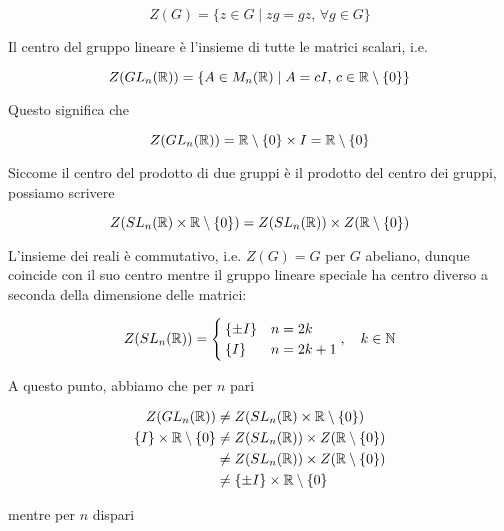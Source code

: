 \begin{equation}
	Z(G) = \{ z \in G \mid zg = gz, \, \forall g \in G \}
\end{equation}

Il centro del gruppo lineare è l'insieme di tutte le matrici scalari, i.e.

\begin{equation}
	Z(GL_{n}(\mathbb{R})) = \{ A \in M_{n}(\mathbb{R}) \mid A = c I, \, c \in \mathbb{R} \setminus \{0\} \}
\end{equation}

Questo significa che

\begin{equation}
	Z(GL_{n}(\mathbb{R})) = \mathbb{R} \setminus \{0\} \times I = \mathbb{R} \setminus \{0\}
\end{equation}

Siccome il centro del prodotto di due gruppi è il prodotto del centro dei gruppi, possiamo scrivere

\begin{equation}
	Z(SL_{n}(\mathbb{R}) \times \mathbb{R} \setminus \{0\}) = Z(SL_{n}(\mathbb{R})) \times Z(\mathbb{R} \setminus \{0\})
\end{equation}

L'insieme dei reali è commutativo, i.e. $ Z(G) = G $ per $ G $ abeliano, dunque coincide con il suo centro mentre il gruppo lineare speciale ha centro diverso a seconda della dimensione delle matrici:

\begin{equation}
	Z(SL_{n}(\R)) = %
	\begin{cases}
		\{ \pm I \} & n = 2 k\\
		\{ I \} & n = 2 k + 1
	\end{cases}%
	\qcomma k \in \N
\end{equation}

A questo punto, abbiamo che per $ n $ pari

\begin{align}
	\begin{split}
		Z(GL_{n}(\mathbb{R})) &\neq Z(SL_{n}(\mathbb{R}) \times \mathbb{R} \setminus \{0\})\\
		\{ I \} \times \mathbb{R} \setminus \{0\} &\neq Z(SL_{n}(\mathbb{R})) \times Z(\mathbb{R} \setminus \{0\})\\
		&\neq Z(SL_{n}(\mathbb{R})) \times Z(\mathbb{R} \setminus \{0\})\\
		&\neq \{ \pm I \} \times \mathbb{R} \setminus \{0\}
	\end{split}
\end{align}

mentre per $ n $ dispari

